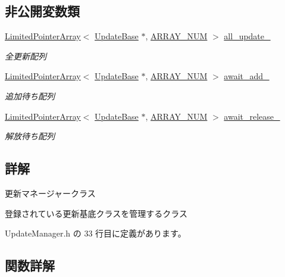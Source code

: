 \subsection*{非公開変数類}
\begin{DoxyCompactItemize}
\item 
\mbox{\hyperlink{class_limited_pointer_array}{Limited\+Pointer\+Array}}$<$ \mbox{\hyperlink{class_update_base}{Update\+Base}} $\ast$, \mbox{\hyperlink{class_update_manager_a280b884fb6a025cfd92d4f93086c60c6}{A\+R\+R\+A\+Y\+\_\+\+N\+UM}} $>$ \mbox{\hyperlink{class_update_manager_a1e22347205a91812355ccb0b61538754}{all\+\_\+update\+\_\+}}
\begin{DoxyCompactList}\small\item\em 全更新配列 \end{DoxyCompactList}\item 
\mbox{\hyperlink{class_limited_pointer_array}{Limited\+Pointer\+Array}}$<$ \mbox{\hyperlink{class_update_base}{Update\+Base}} $\ast$, \mbox{\hyperlink{class_update_manager_a280b884fb6a025cfd92d4f93086c60c6}{A\+R\+R\+A\+Y\+\_\+\+N\+UM}} $>$ \mbox{\hyperlink{class_update_manager_acebe668ec93509bdb16c48de1430a49b}{await\+\_\+add\+\_\+}}
\begin{DoxyCompactList}\small\item\em 追加待ち配列 \end{DoxyCompactList}\item 
\mbox{\hyperlink{class_limited_pointer_array}{Limited\+Pointer\+Array}}$<$ \mbox{\hyperlink{class_update_base}{Update\+Base}} $\ast$, \mbox{\hyperlink{class_update_manager_a280b884fb6a025cfd92d4f93086c60c6}{A\+R\+R\+A\+Y\+\_\+\+N\+UM}} $>$ \mbox{\hyperlink{class_update_manager_aa04ddba3d6d9b5ad4d36749e9d81955c}{await\+\_\+release\+\_\+}}
\begin{DoxyCompactList}\small\item\em 解放待ち配列 \end{DoxyCompactList}\end{DoxyCompactItemize}


\subsection{詳解}
更新マネージャークラス 

登録されている更新基底クラスを管理するクラス 

 Update\+Manager.\+h の 33 行目に定義があります。



\subsection{関数詳解}
\mbox{\label{class_update_manager_a7bb1af3bffcc4d72333ac86ae411891e}} 
